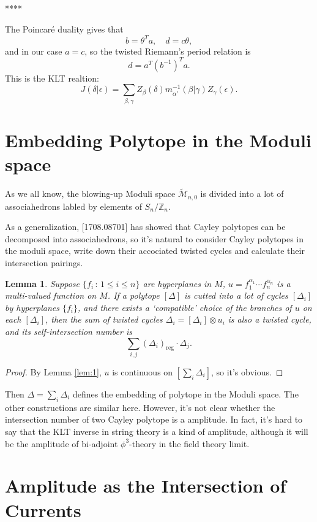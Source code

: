 \documentclass[11pt]{article}
\newcommand{\zz}{\mathbb{Z}}
\theoremstyle{definition}
\theoremstyle{plain}
\newtheorem{lem}[para]{Lemma}
\begin{document}
****

The Poincar\'e duality gives that
\[
	b=\theta^T a,\quad d=c\theta,
\]
and in our case $a=c$, so the twisted Riemann's period relation is
\[
	d=a^T(b^{-1})^Ta.
\]
This is the KLT realtion:
\[
	J(\delta|\epsilon)=\sum_{\beta,\gamma}Z_{\beta}(\delta)
	m^{-1}_{\alpha'}(\beta|\gamma)Z_\gamma(\epsilon).
\]

\section{Embedding Polytope in the Moduli space}

As we all know, the blowing-up Moduli space 
$\widetilde{\mathcal M}_{n,0}$
is divided into a lot of associahedrons labled by elements of 
$S_n/\zz_n$. 

As a generalization, [1708.08701] has showed that Cayley polytopes
can be decomposed into associahedrons, so it's natural to consider 
Cayley polytopes in the moduli space, write down their
accociated twisted cycles and calculate their intersection
pairings. 

\begin{lem}
Suppose $\{f_i\,:\,1\leq i\leq n\}$ are hyperplanes in $M$, 
$u=f_1^{\alpha_1}\cdots f_n^{\alpha_n}$ is a multi-valued 
function on $M$. If a polytope $[\Delta]$ is cutted into 
a lot of cycles $[\Delta_i]$ by hyperplanes $\{f_i\}$, and 
there exists a `compatible' choice of the branches of $u$ on 
each $[\Delta_i]$, then the sum of twisted cycles 
$\Delta_i=[\Delta_i]\otimes u_i$ is also a twisted cycle, and
its self-intersection number is
\[
	\sum_{i,j}(\Delta_i)_{\mathrm{reg}}\cdot \Delta_j.
\]
\end{lem}

\begin{proof}
By Lemma \ref{lem:1}, $u$ is continuous on $[\sum_i\Delta_i]$, 
so it's obvious.
\end{proof}

Then $\Delta=\sum_i \Delta_i$ defines the embedding of 
polytope in the Moduli space. The other constructions are
similar here. However, it's not clear whether the intersection 
number of two Cayley polytope is a amplitude. In fact,
it's hard to say that the KLT inverse in string theory
is a kind of amplitude, although it will be the
amplitude of bi-adjoint $\phi^3$-theory in the field
theory limit.

\section{Amplitude as the Intersection of Currents}
\end{document}
